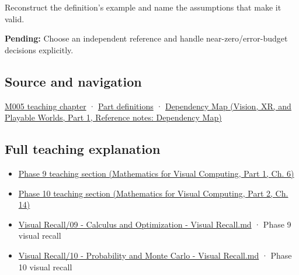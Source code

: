 \hypertarget{appendix-3ae74e89b4e6-recall-and-next-depth}{}

Reconstruct the definition's example and name the assumptions that make it valid.

\textbf{Pending:} Choose an independent reference and handle near-zero/error-budget decisions explicitly.

\subsection{Source and navigation}\label{appendix-3ae74e89b4e6-source-and-navigation}

\hypertarget{appendix-3ae74e89b4e6-source-and-navigation}{}

\hyperref[01-foundations-i-ch001-when-arithmetic-meets-uncertainty]{M005 teaching chapter} · \hyperref[appendix-fd090d982a15-m005---parts-77-88]{Part definitions} · \href{../07-Vision-XR-and-Playable-Worlds-P01/main.pdf\#nameddest=appendix-4ad47bdd269a}{Dependency Map (Vision, XR, and Playable Worlds, Part 1, Reference notes: Dependency Map)}

\subsection{Full teaching explanation}\label{appendix-3ae74e89b4e6-full-teaching-explanation}

\hypertarget{appendix-3ae74e89b4e6-full-teaching-explanation}{}

\begin{itemize}
\tightlist
\item
  \href{../02-Mathematics-for-Visual-Computing-P01/main.pdf\#nameddest=02-foundations-ii-ch022-numerical-differentiation-and-automatic-differentiation}{Phase 9 teaching section (Mathematics for Visual Computing, Part 1, Ch. 6)}
\item
  \href{../02-Mathematics-for-Visual-Computing-P02/main.pdf\#nameddest=02-foundations-ii-ch030-inference-and-error-metrics-need-explicit-assumptions}{Phase 10 teaching section (Mathematics for Visual Computing, Part 2, Ch. 14)}
\item
  \hyperref[appendix-adf48f5dc5c1]{Visual Recall/09 - Calculus and Optimization - Visual Recall.md} · Phase 9 visual recall
\item
  \hyperref[appendix-cb5af353ef77]{Visual Recall/10 - Probability and Monte Carlo - Visual Recall.md} · Phase 10 visual recall
\end{itemize}
